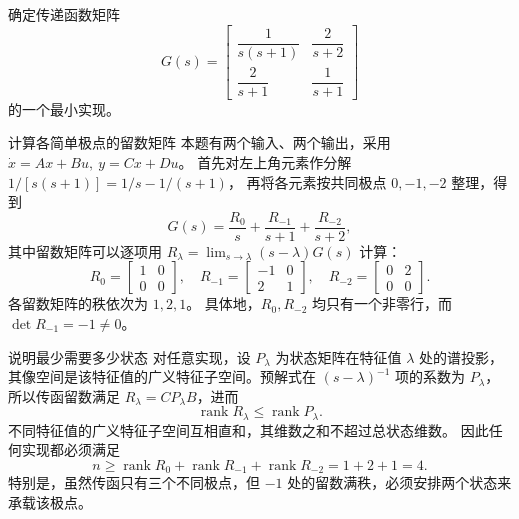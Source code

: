 \documentclass[11pt]{article}
\begin{document}
\begin{problem}[原题 6(7)]
确定传递函数矩阵
\[
G(s)=\begin{bmatrix}\dfrac1{s(s+1)}&\dfrac2{s+2}\\[2mm]
\dfrac2{s+1}&\dfrac1{s+1}\end{bmatrix}
\]
的一个最小实现。
\end{problem}
\begin{solution}
\begin{proofstep}{计算各简单极点的留数矩阵}
本题有两个输入、两个输出，采用 $\dot x=Ax+Bu,\ y=Cx+Du$。
首先对左上角元素作分解 $1/[s(s+1)]=1/s-1/(s+1)$，
再将各元素按共同极点 $0,-1,-2$ 整理，得到
\[
G(s)=\frac{R_0}{s}+\frac{R_{-1}}{s+1}+\frac{R_{-2}}{s+2},
\]
其中留数矩阵可以逐项用 $R_\lambda=\lim_{s\to\lambda}(s-\lambda)G(s)$ 计算：
\[
R_0=\begin{bmatrix}1&0\\0&0\end{bmatrix},\quad
R_{-1}=\begin{bmatrix}-1&0\\2&1\end{bmatrix},\quad
R_{-2}=\begin{bmatrix}0&2\\0&0\end{bmatrix}.
\]
各留数矩阵的秩依次为 $1,2,1$。
具体地，$R_0,R_{-2}$ 均只有一个非零行，而 $\det R_{-1}=-1\ne0$。
\end{proofstep}

\begin{proofstep}{说明最少需要多少状态}
对任意实现，设 $P_\lambda$ 为状态矩阵在特征值 $\lambda$ 处的谱投影，
其像空间是该特征值的广义特征子空间。预解式在 $(s-\lambda)^{-1}$ 项的系数为 $P_\lambda$，
所以传函留数满足 $R_\lambda=CP_\lambda B$，进而
\[
\operatorname{rank}R_\lambda\le\operatorname{rank}P_\lambda.
\]
不同特征值的广义特征子空间互相直和，其维数之和不超过总状态维数。
因此任何实现都必须满足
\[
n\ge\operatorname{rank}R_0+\operatorname{rank}R_{-1}+\operatorname{rank}R_{-2}=1+2+1=4.
\]
特别是，虽然传函只有三个不同极点，但 $-1$ 处的留数满秩，必须安排两个状态来承载该极点。
\end{proofstep}


\end{solution}
\end{document}
